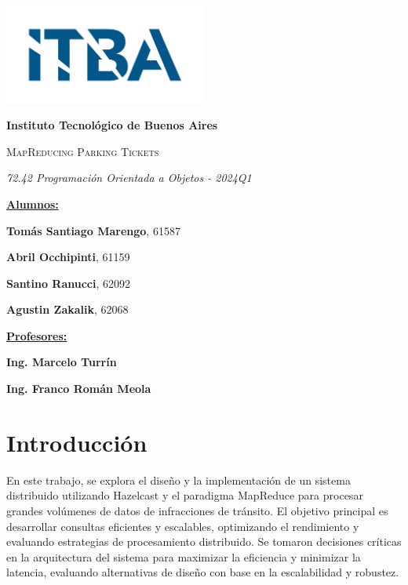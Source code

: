 \documentclass[a4paper,12pt]{article}
\begin{document}
	
	\begin{titlepage}
		\centering
			{\includegraphics[width=0.50\textwidth]{LogoITBA}\par}
			{\bfseries\LARGE Instituto Tecnol\'ogico de Buenos Aires \par}
			\vspace{2cm}
			{\scshape\Huge MapReducing Parking Tickets \par}
			\vspace{0.5cm}
			{\itshape\Large 72.42 Programación Orientada a Objetos - 2024Q1 \par}
			\vspace{1cm}
			
			{\Large \textbf{\underline{Alumnos:}} \par}
			{\Large \large \textbf{Tomás Santiago Marengo}, 61587 \par}
			{\Large \large \textbf{Abril Occhipinti}, 61159 \par}	
			{\Large \large \textbf{Santino Ranucci}, 62092 \par}	
			{\Large \large \textbf{Agustin Zakalik}, 62068 \par}	
			
			\vspace{1cm}
			
			{\Large \textbf{\underline{Profesores:}} \par}
			{\Large \large \textbf{Ing. Marcelo Turrín} \par}
			{\Large \large \textbf{Ing. Franco Román Meola} \par}		
			
			\vfill
	\end{titlepage}
	
	\newpage
	\tableofcontents
	\newpage
	
	\section{Introducción}
	
	En este trabajo, se explora el diseño y la implementación de un sistema distribuido utilizando Hazelcast y el paradigma MapReduce para procesar grandes volúmenes de datos de infracciones de tránsito. El objetivo principal es desarrollar consultas eficientes y escalables, optimizando el rendimiento y evaluando estrategias de procesamiento distribuido. Se tomaron decisiones críticas en la arquitectura del sistema para maximizar la eficiencia y minimizar la latencia, evaluando alternativas de diseño con base en la escalabilidad y robustez.
	
\end{document}
